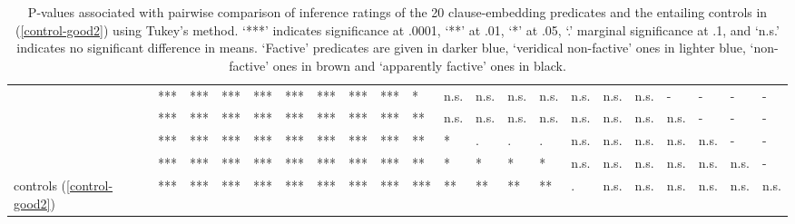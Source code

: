 \documentclass[11pt,fleqn]{article}
\newcommand{\6}{\mbox{$[\hspace*{-.6mm}[$}}
\newcommand{\9}{\mbox{$]\hspace*{-.6mm}]$}}
\begin{document}
\begin{table}[h!]
\begin{tabular}{l l l l l l l l l l l l l l l l l l l l l }
\color{blue}{\em discover}\color{black}			& *** & *** & *** & *** & *** & *** & *** & *** & * & n.s. & n.s. & n.s. & n.s. & n.s. & n.s. & n.s. & - & - & - & -\\
\color{blue}{\em see}\color{black}			& *** & *** & *** & *** & *** & *** & *** & *** & ** & n.s. & n.s. & n.s. & n.s. & n.s. & n.s. & n.s. & n.s. & - & - & - \\
\color{airforceblue}{\em be right}\color{black}			& *** & *** & *** & *** & *** & *** & *** & *** & ** & * & . & . & . & n.s. & n.s. & n.s. & n.s. & n.s. & - & - \\
\color{black}{\em prove}\color{black}		& *** & *** & *** & *** & *** & *** & *** & *** & **  & *  & * & * & * & n.s. & n.s. & n.s. & n.s. & n.s. & n.s. & - \\
\color{black}controls (\ref{control-good2})\color{black}		& *** & *** & *** & *** & *** & *** & *** & *** & ***  & ** & ** & ** & ** & . & n.s. & n.s. & n.s. & n.s. & n.s.  & n.s. \\

\bottomrule
\end{tabular}
\caption{P-values associated with pairwise comparison of inference ratings of the 20 clause-embedding predicates and the entailing controls in (\ref{control-good2}) using Tukey's method. `***' indicates significance at .0001, `**' at .01, `*' at .05, `.' marginal significance at .1, and `n.s.' indicates no significant difference in means. `Factive' predicates are given in darker blue, `veridical non-factive' ones in lighter blue, `non-factive' ones in brown and `apparently factive' ones in black.}\label{t-pairwise2}
\end{table}
\end{document}
